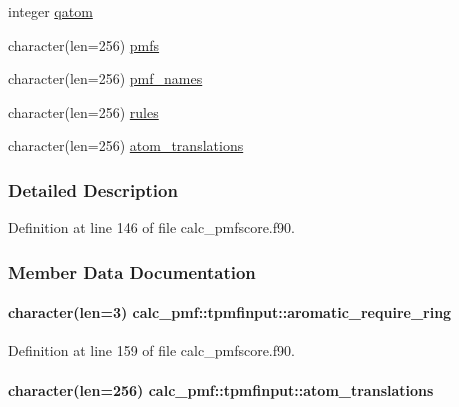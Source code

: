 \begin{DoxyCompactItemize}
\item 
integer \hyperlink{structcalc__pmf_1_1tpmfinput_a4ba14d72424ce79ccca496b86afb5c06}{qatom}
\item 
character(len=256) \hyperlink{structcalc__pmf_1_1tpmfinput_a546df7edfc9dfe583c92c0fe3f3e1081}{pmfs}
\item 
character(len=256) \hyperlink{structcalc__pmf_1_1tpmfinput_a1cc73a339edd22ce5fc0ac74f516609d}{pmf\-\_\-names}
\item 
character(len=256) \hyperlink{structcalc__pmf_1_1tpmfinput_abf2083ff474fedb94c80061cc17aeac9}{rules}
\item 
character(len=256) \hyperlink{structcalc__pmf_1_1tpmfinput_a2a0ec767f323ed9e5d7e2097e9397579}{atom\-\_\-translations}
\end{DoxyCompactItemize}


\subsubsection{Detailed Description}


Definition at line 146 of file calc\-\_\-pmfscore.\-f90.



\subsubsection{Member Data Documentation}
\hypertarget{structcalc__pmf_1_1tpmfinput_af0a260f10ecb417b06c204a6c6197af9}{
\paragraph[{aromatic\-\_\-require\-\_\-ring}]{\setlength{\rightskip}{0pt plus 5cm}character(len=3) calc\-\_\-pmf\-::tpmfinput\-::aromatic\-\_\-require\-\_\-ring}}\label{structcalc__pmf_1_1tpmfinput_af0a260f10ecb417b06c204a6c6197af9}


Definition at line 159 of file calc\-\_\-pmfscore.\-f90.

\hypertarget{structcalc__pmf_1_1tpmfinput_a2a0ec767f323ed9e5d7e2097e9397579}{
\paragraph[{atom\-\_\-translations}]{\setlength{\rightskip}{0pt plus 5cm}character(len=256) calc\-\_\-pmf\-::tpmfinput\-::atom\-\_\-translations}}\label{structcalc__pmf_1_1tpmfinput_a2a0ec767f323ed9e5d7e2097e9397579}


